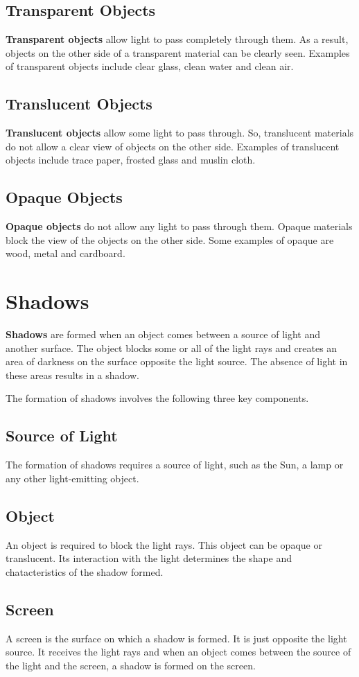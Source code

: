 \subsection{Transparent Objects}
\textbf{Transparent objects} allow light to pass completely through them. As a result, objects on the other side of a transparent material can be clearly seen. Examples of transparent objects include clear glass, clean water and clean air.
\subsection{Translucent Objects}
\textbf{Translucent objects} allow some light to pass through. So, translucent materials do not allow a clear view of objects on the other side. Examples of translucent objects include trace paper, frosted glass and muslin cloth.
\subsection{Opaque Objects}
\textbf{Opaque objects} do not allow any light to pass through them. Opaque materials block the view of the objects on the other side. Some examples of opaque are wood, metal and cardboard.
\vspace{1.4in}
\section{Shadows}
\textbf{Shadows} are formed when an object comes between a source of light and another surface. The object blocks some or all of the light rays and creates an area of darkness on the surface opposite the light source. The absence of light in these areas results in a shadow.
\par
The formation of shadows involves the following three key components.
\subsection{Source of Light}
The formation of shadows requires a source of light, such as the Sun, a lamp or any other light-emitting object.
\subsection{Object}
An object is required to block the light rays. This object can be opaque or translucent. Its interaction with the light determines the shape and chatacteristics of the shadow formed.
\subsection{Screen}
A screen is the surface on which a shadow is formed. It is just opposite the light source. It receives the light rays and when an object comes between the source of the light and the screen, a shadow is formed on the screen.
\vspace{0.8in}
